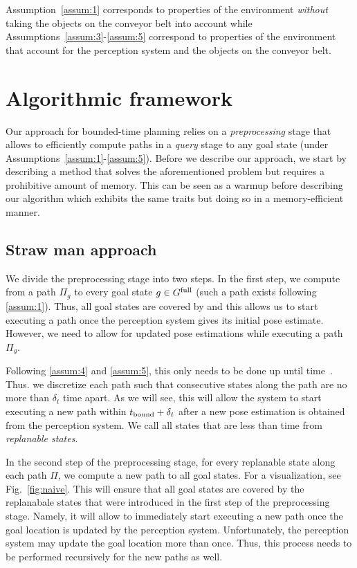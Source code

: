 \documentclass[conference]{IEEEtran}
\begin{document}
Assumption~\ref{assum:1} corresponds to properties of the environment \emph{without} taking the objects on the conveyor belt into account 
while
Assumptions~\ref{assum:3}-\ref{assum:5} correspond to properties of the environment that account for the perception system and the objects on the conveyor belt.


\section{Algorithmic framework}
\label{subsec:strawman}
Our approach for bounded-time planning relies on a \emph{preprocessing} stage that allows to efficiently compute paths in a \emph{query} stage to any goal state (under Assumptions~\ref{assum:1}-\ref{assum:5}). 
%
Before we describe our approach, we start by describing a \naive method that solves the aforementioned problem but requires a prohibitive amount of memory.
%
This can be seen as a warmup before describing our algorithm which exhibits the same traits but doing so in a memory-efficient manner.

\subsection{Straw man approach}
We divide the preprocessing stage into two steps.
In the first step, we compute from \Shome a path $\Pi_g$ to every goal state $ g \in G^{\textrm{full}}$ (such a path exists following \ref{assum:1}).
Thus, all goal states are covered by \Shome and this allows us to start executing a path once the perception system gives its initial pose estimate.
However, we need to allow for updated pose estimations while executing a path $\Pi_g$. 

%
Following \ref{assum:4} and \ref{assum:5}, this only needs to be done up until time~\Trc.
Thus. we discretize each path such that consecutive states along the path are no more than $\delta _t$ time apart. As we will see, this will allow the system to start executing a new path within $t_{\textrm{bound}} + \delta_t$ after a new pose estimation is obtained from the perception system.
%
We call all states that are less than \Trc time from \Shome \emph{replanable states}.


In the second step of the preprocessing stage, for every replanable state along each path $\Pi$, we compute a new path to all goal states.
For a visualization, see Fig.~\ref{fig:naive}.
%
This will ensure that all goal states are covered by the replanabale states that were introduced in the first step of the preprocessing stage. Namely, it will allow to immediately start executing a new path once the goal location is updated by the perception system.
%
Unfortunately, the perception system may update the goal location more than once. Thus, this process needs to be performed recursively for the new paths as well.
\end{document}
